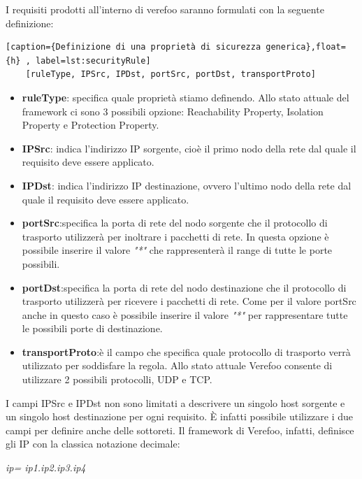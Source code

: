 I requisiti prodotti all'interno di verefoo saranno formulati con la seguente definizione:

\begin{lstlisting}[caption={Definizione di una proprietà di sicurezza generica},float={h} , label=lst:securityRule]
    [ruleType, IPSrc, IPDst, portSrc, portDst, transportProto]
\end{lstlisting}

\begin{itemize}
    \item \textbf{ruleType}: specifica quale proprietà stiamo definendo. Allo stato attuale del framework ci sono 3 possibili opzione: Reachability Property, Isolation Property e Protection Property.
    \item \textbf{IPSrc}: indica l'indirizzo IP sorgente, cioè il primo nodo della rete dal quale il requisito deve essere applicato.
    \item \textbf{IPDst}: indica l'indirizzo IP destinazione, ovvero l'ultimo nodo della rete dal quale il requisito deve essere applicato.
    \item \textbf{portSrc}:specifica la porta di rete del nodo sorgente che il protocollo di trasporto utilizzerà per inoltrare i pacchetti di rete. In questa opzione è possibile 
        inserire il valore \textit{"*"} che rappresenterà il range di tutte le porte possibili.
    \item \textbf{portDst}:specifica la porta di rete del nodo destinazione che il protocollo di trasporto utilizzerà per ricevere i pacchetti di rete. Come per il valore 
        portSrc anche in questo caso è possibile inserire il valore \textit{"*"} per rappresentare tutte le possibili porte di destinazione.
    \item \textbf{transportProto}:è il campo che specifica quale protocollo di trasporto verrà utilizzato per soddisfare la regola. Allo stato attuale Verefoo consente di utilizzare 2 possibili protocolli, UDP e TCP.
\end{itemize}

\newpage

I campi IPSrc e IPDst non sono limitati a descrivere un singolo host sorgente e un singolo host destinazione per ogni requisito. È infatti possibile utilizzare i due campi per definire anche delle sottoreti. 
Il framework di Verefoo, infatti, definisce gli IP con la classica notazione decimale:

\begin{center}
    \centering  %
    \textit{ip= ip1.ip2.ip3.ip4}
\end{center}

